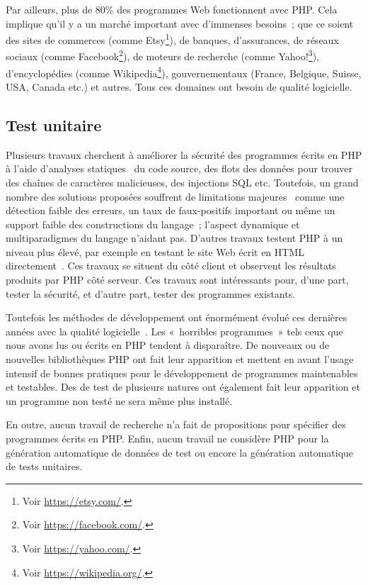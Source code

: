 Par ailleurs, plus de 80\% des programmes Web fonctionnent avec PHP. Cela
implique qu'il y a un marché important avec d'immenses besoins~; que ce soient
des sites de commerces (comme Etsy\footnote{Voir \url{https://etsy.com/}.}), de
banques, d'assurances, de réseaux sociaux (comme Facebook\footnote{Voir
\url{https://facebook.com/}.}), de moteurs de recherche (comme
Yahoo!\footnote{Voir \url{https://yahoo.com/}.}), d'encyclopédies (comme
Wikipedia\footnote{Voir \url{https://wikipedia.org/}.}), gouvernementaux
(France, Belgique, Suisse, USA, Canada etc.) et autres. Tous ces domaines ont
besoin de qualité logicielle.

\subsection{Test unitaire}

Plusieurs travaux cherchent à améliorer la sécurité des programmes écrits en PHP
à l'aide d'analyses statiques~ du code source, des flots des données pour trouver des
chaînes de caractères malicieuses, des injections SQL etc. Toutefois, un grand
nombre des solutions proposées souffrent de limitations
majeures~ comme une détection faible des erreurs, un taux de
faux-positifs important ou même un support faible des constructions du langage~;
l'aspect dynamique et multiparadigmes du langage n'aidant pas. D'autres travaux
testent PHP à un niveau plus élevé, par exemple en testant le site Web écrit en
HTML directement~.
Ces travaux se situent du côté client et observent les résultats produits par
PHP côté serveur. Ces travaux sont intéressants pour, d'une part, tester la
sécurité, et d'autre part, tester des programmes existants.

Toutefois les méthodes de développement ont énormément évolué ces dernières
années avec la qualité logicielle~. Les «~horribles
programmes~» tels ceux que nous avons lus ou écrits en PHP tendent à
disparaître. De nouveaux  ou de nouvelles bibliothèques
PHP ont fait leur apparition et mettent en avant l'usage intensif de bonnes
pratiques pour le développement de programmes maintenables et testables. Des
 de test de plusieurs natures ont également fait leur
apparition et un programme non testé ne sera même plus installé. 

En outre, aucun travail de recherche n'a fait de propositions pour spécifier des
programmes écrits en PHP. Enfin, aucun travail ne considère PHP pour la
génération automatique de données de test ou encore la génération automatique de
tests unitaires.


